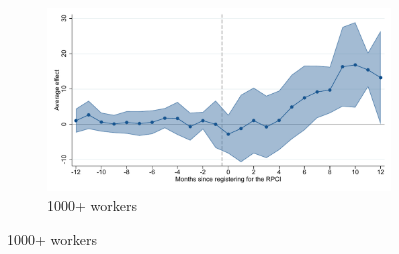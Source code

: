 \begin{figure}[H]
    \begin{subfigure}{0.32\textwidth}
    \caption{1000+ workers}
    \includegraphics[width=\textwidth]{04_Figures/muestra_10porciento/event_study_sal_cierre_size_1001_dcdh_connected.pdf}
    \end{subfigure}
    
\end{figure}

\clearpage


